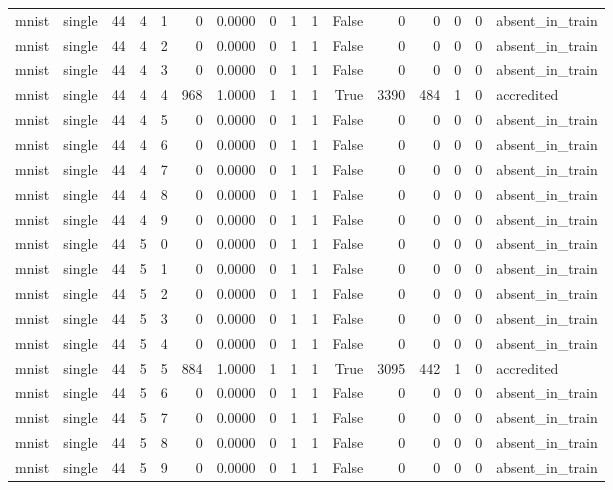 \begin{tabular}{llrrrrrrrrrrrrrl}
mnist & single & 44 & 4 & 1 & 0 & 0.0000 & 0 & 1 & 1 & False & 0 & 0 & 0 & 0 & absent\_in\_train \\
mnist & single & 44 & 4 & 2 & 0 & 0.0000 & 0 & 1 & 1 & False & 0 & 0 & 0 & 0 & absent\_in\_train \\
mnist & single & 44 & 4 & 3 & 0 & 0.0000 & 0 & 1 & 1 & False & 0 & 0 & 0 & 0 & absent\_in\_train \\
mnist & single & 44 & 4 & 4 & 968 & 1.0000 & 1 & 1 & 1 & True & 3390 & 484 & 1 & 0 & accredited \\
mnist & single & 44 & 4 & 5 & 0 & 0.0000 & 0 & 1 & 1 & False & 0 & 0 & 0 & 0 & absent\_in\_train \\
mnist & single & 44 & 4 & 6 & 0 & 0.0000 & 0 & 1 & 1 & False & 0 & 0 & 0 & 0 & absent\_in\_train \\
mnist & single & 44 & 4 & 7 & 0 & 0.0000 & 0 & 1 & 1 & False & 0 & 0 & 0 & 0 & absent\_in\_train \\
mnist & single & 44 & 4 & 8 & 0 & 0.0000 & 0 & 1 & 1 & False & 0 & 0 & 0 & 0 & absent\_in\_train \\
mnist & single & 44 & 4 & 9 & 0 & 0.0000 & 0 & 1 & 1 & False & 0 & 0 & 0 & 0 & absent\_in\_train \\
mnist & single & 44 & 5 & 0 & 0 & 0.0000 & 0 & 1 & 1 & False & 0 & 0 & 0 & 0 & absent\_in\_train \\
mnist & single & 44 & 5 & 1 & 0 & 0.0000 & 0 & 1 & 1 & False & 0 & 0 & 0 & 0 & absent\_in\_train \\
mnist & single & 44 & 5 & 2 & 0 & 0.0000 & 0 & 1 & 1 & False & 0 & 0 & 0 & 0 & absent\_in\_train \\
mnist & single & 44 & 5 & 3 & 0 & 0.0000 & 0 & 1 & 1 & False & 0 & 0 & 0 & 0 & absent\_in\_train \\
mnist & single & 44 & 5 & 4 & 0 & 0.0000 & 0 & 1 & 1 & False & 0 & 0 & 0 & 0 & absent\_in\_train \\
mnist & single & 44 & 5 & 5 & 884 & 1.0000 & 1 & 1 & 1 & True & 3095 & 442 & 1 & 0 & accredited \\
mnist & single & 44 & 5 & 6 & 0 & 0.0000 & 0 & 1 & 1 & False & 0 & 0 & 0 & 0 & absent\_in\_train \\
mnist & single & 44 & 5 & 7 & 0 & 0.0000 & 0 & 1 & 1 & False & 0 & 0 & 0 & 0 & absent\_in\_train \\
mnist & single & 44 & 5 & 8 & 0 & 0.0000 & 0 & 1 & 1 & False & 0 & 0 & 0 & 0 & absent\_in\_train \\
mnist & single & 44 & 5 & 9 & 0 & 0.0000 & 0 & 1 & 1 & False & 0 & 0 & 0 & 0 & absent\_in\_train \\

\end{tabular}
